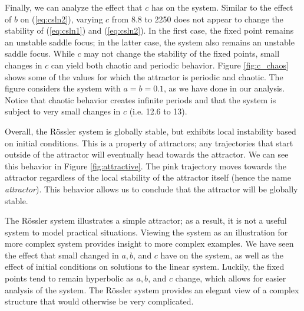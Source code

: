 \documentclass{article}
\begin{document}
Finally, we can analyze the effect that $c$ has on the system. Similar to the effect of $b$ on (\ref{eq:csln2}), varying $c$ from $8.8$ to 2250 does not appear to change the stability of (\ref{eq:csln1}) and (\ref{eq:csln2}). In the first case, the fixed point remains an unstable saddle focus; in the latter case, the system also remains an unstable saddle focus. While $c$ may not change the stability of the fixed points, small changes in $c$ can yield both chaotic and periodic behavior. Figure \ref{fig:c_chaos} shows some of the values for which the attractor is periodic and chaotic. The figure considers the system with $a=b=0.1$, as we have done in our analysis. Notice that chaotic behavior creates infinite periods and that the system is subject to very small changes in $c$ (i.e. 12.6 to 13).

Overall, the R\"{o}ssler system is globally stable, but exhibits local instability based on initial conditions. This is a property of attractors; any trajectories that start outside of the attractor will eventually head towards the attractor. We can see this behavior in Figure \ref{fig:attractive}. The pink trajectory moves towards the attractor regardless of the local stability of the attractor itself (hence the name \textit{attractor}). This behavior allows us to conclude that the attractor will be globally stable.

The R\"{o}ssler system illustrates a simple attractor; as a result, it is not a useful system to model practical situations. Viewing the system as an illustration for more complex system provides insight to more complex examples. We have seen the effect that small changed in $a,b$, and $c$ have on the system, as well as the effect of initial conditions on solutions to the linear system. Luckily, the fixed points tend to remain hyperbolic as $a,b$, and $c$ change, which allows for easier analysis of the system. The R\"{o}ssler system provides an elegant view of a complex structure that would otherwise be very complicated.

\newpage
\clearpage
\end{document}

